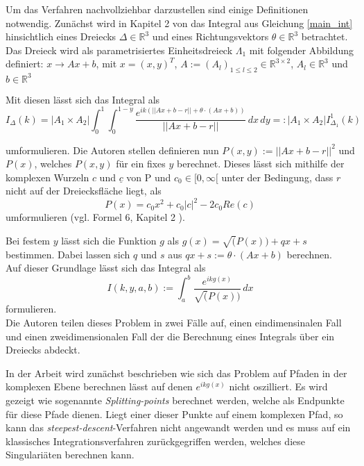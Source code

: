 Um das Verfahren nachvollziehbar darzustellen sind einige Definitionen notwendig.
Zunächst wird in Kapitel 2 von \cite{gasperini:hal-03209144} das Integral aus Gleichung \ref{main_int} hinsichtlich eines Dreiecks $\Delta \in \mathbb{R}^3$ und eines Richtungsvektors $\theta \in \mathbb{R}^3$ betrachtet.
Das Dreieck wird als parametrisiertes Einheitsdreieck $\Lambda_1$ mit folgender Abbildung definiert: $x \rightarrow Ax + b$, mit $x = (x,y)^T$, $A:= (A_l)_{1\leq l \leq 2} \in \mathbb{R}^{3\times 2}$, $A_l \in \mathbb{R}^3$ und $b \in \mathbb{R}^3$ 

Mit diesen lässt sich das Integral als
\begin{equation}
    I_{\Delta}(k) = |A_1 \times A_2 | \int_{0}^{1} \int_{0}^{1-y}  \frac{e^{ik(||Ax + b - r|| +\theta \cdot (Ax +b))}}{||Ax + b - r ||}\,dx  \,dy  =: |A_1 \times A_2 | I_{\Delta_1}^1(k)
\end{equation}\label{main_def_int}

umformulieren. Die Autoren stellen definieren nun $P(x,y) := ||Ax+b-r||^2$ und $P(x)$, welches $P(x,y)$ für ein fixes $y$ berechnet.
Dieses lässt sich mithilfe der komplexen Wurzeln $c$ und $\underline{c}$ von P und $c_0 \in [0,\infty[$ unter der Bedingung, dass $r$ nicht auf der Dreiecksfläche liegt, als 
\begin{equation}
    P(x) = c_0x^2+c_0|c|^2-2c_0Re(c)
\end{equation}
umformulieren (vgl. Formel 6, Kapitel 2 \cite{gasperini:hal-03209144}).

Bei festem $y$ lässt sich die Funktion $g$ als $g(x) = \sqrt(P(x)) + qx + s$ bestimmen. Dabei lassen sich $q$ und $s$ aus $qx + s := \theta \cdot(Ax+b)$ berechnen.\\

Auf dieser Grundlage lässt sich das Integral als 
\begin{equation}
    I(k,y,a,b) := \int_{a}^{b}  \frac{e^{ikg(x)}}{\sqrt(P(x))}\,dx 
\end{equation}
formulieren.\\


Die Autoren teilen dieses Problem in zwei Fälle auf, einen eindimensinalen Fall und einen zweidimensionalen Fall der die Berechnung eines Integrals über ein Dreiecks abdeckt.


In der Arbeit \cite{gasperini:hal-03209144} wird zunächst beschrieben wie sich das Problem auf Pfaden in der komplexen Ebene berechnen lässt auf denen $e^{ikg(x)}$ nicht oszilliert.
Es wird gezeigt wie sogenannte \textit{Splitting-points} berechnet werden, welche als Endpunkte für diese Pfade dienen.
Liegt einer dieser Punkte auf einem komplexen Pfad, so kann das \textit{steepest-descent}-Verfahren nicht angewandt werden und es muss auf ein klassisches Integrationsverfahren zurückgegriffen werden, welches diese Singulariäten berechnen kann.


